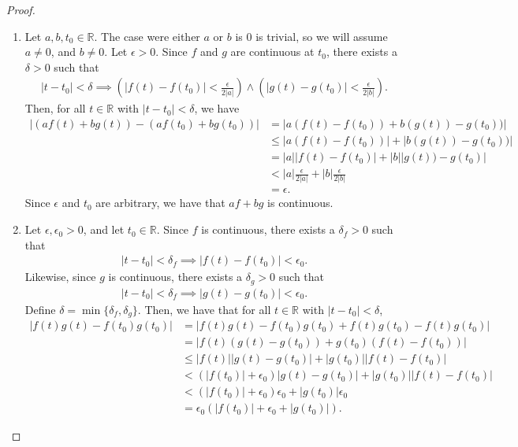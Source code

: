 \documentclass[10pt,a4paper]{article}
\theoremstyle{theorem}
\theoremstyle{definition}
\begin{document}
\begin{proof}
\begin{enumerate}
\item Let $a, b,t_0 \in \mathbb{R}$.  The case were either $a$ or $b$ is $0$ is trivial, so we will assume $a \not = 0$,  and $b \not = 0$. Let $\epsilon >0$. Since $f$ and $g$ are continuous at $t_0$, there exists a $\delta > 0$ such that
\begin{align*}
|t - t_0| < \delta \implies (|f(t) - f(t_0)| < \frac{\epsilon}{2|a|}) \land (|g(t) - g(t_0)| < \frac{\epsilon}{2|b|}).
\end{align*}
Then, for all $t \in \mathbb{R}$ with $|t - t_0| < \delta$, we have
\begin{align*}
|(af(t) + bg(t)) - (af(t_0) + bg(t_0))| &= |a(f(t) - f(t_0)) + b(g(t)) - g(t_0))| \\
&\leq |a(f(t) - f(t_0))| + |b(g(t)) - g(t_0))| \\
&= |a||f(t) - f(t_0)| + |b||g(t)) - g(t_0)| \\
&< |a|\frac{\epsilon}{2|a|} + |b|\frac{\epsilon}{2|b|} \\
&= \epsilon.
\end{align*}
Since $\epsilon$ and $t_0$ are arbitrary, we have that $af + bg$ is continuous.
\item Let $\epsilon,\epsilon_0 > 0$, and let $t_0 \in \mathbb{R}$.   Since $f$ is continuous, there exists a $\delta_f > 0$ such that
\begin{align*}
|t - t_0| < \delta_f \implies |f(t) - f(t_0)| < \epsilon_0.
\end{align*}
Likewise, since $g$ is continuous, there exists a $\delta_g >0$ such that 
\begin{align*}
|t - t_0| < \delta_f \implies |g(t) - g(t_0)| < \epsilon_0.
\end{align*}
Define $\delta = \min\{\delta_f, \delta_g \}$. Then, we have that for all $t \in \mathbb{R}$ with $|t - t_0| < \delta$, 
\begin{align*}
|f(t)g(t) - f(t_0)g(t_0)| &= |f(t)g(t) - f(t_0)g(t_0) + f(t)g(t_0) - f(t)g(t_0)|\\
&= |f(t)(g(t) - g(t_0)) + g(t_0)(f(t) - f(t_0))|\\
&\leq |f(t)||g(t) - g(t_0)| + |g(t_0)||f(t) - f(t_0)|\\
&< (|f(t_0)| + \epsilon_0)|g(t) - g(t_0)| + |g(t_0)||f(t) - f(t_0)|\\
&< (|f(t_0)| + \epsilon_0)\epsilon_0 + |g(t_0)|\epsilon_0\\
&= \epsilon_0 (|f(t_0)| + \epsilon_0 + |g(t_0)|).

\end{align*}
\end{enumerate}
\end{proof}
\end{document}
